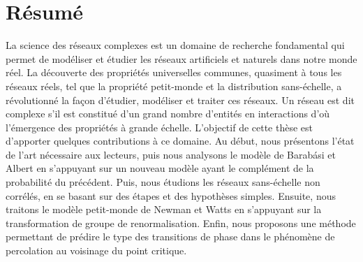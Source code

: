 %
%
\chapter*{Résumé}
La science des réseaux complexes est un domaine de recherche fondamental qui permet de modéliser et étudier les réseaux artificiels et naturels dans notre monde réel. La découverte
des propriétés universelles communes, quasiment à tous les réseaux réels, tel que la propriété petit-monde et la distribution sans-échelle, a révolutionné la façon
d’étudier, modéliser et traiter ces réseaux.
Un réseau est dit complexe s'il est constitué d'un grand nombre d'entités en interactions d’où l’émergence
des propriétés à grande échelle. L'objectif de cette thèse est d'apporter quelques contributions à ce domaine. Au début, nous présentons l’état de l’art nécessaire aux lecteurs, puis nous analysons le modèle de Barabási et Albert en s'appuyant sur un nouveau modèle ayant le complément de la probabilité du précédent. Puis, nous étudions les réseaux sans-échelle non corrélés, en se basant sur des étapes et des hypothèses simples.
Ensuite, nous traitons le modèle petit-monde de Newman et Watts en s'appuyant sur la transformation de groupe de renormalisation.
Enfin, nous proposons une méthode permettant de prédire le type des transitions de phase  dans le phénomène de percolation au voisinage du point critique.
